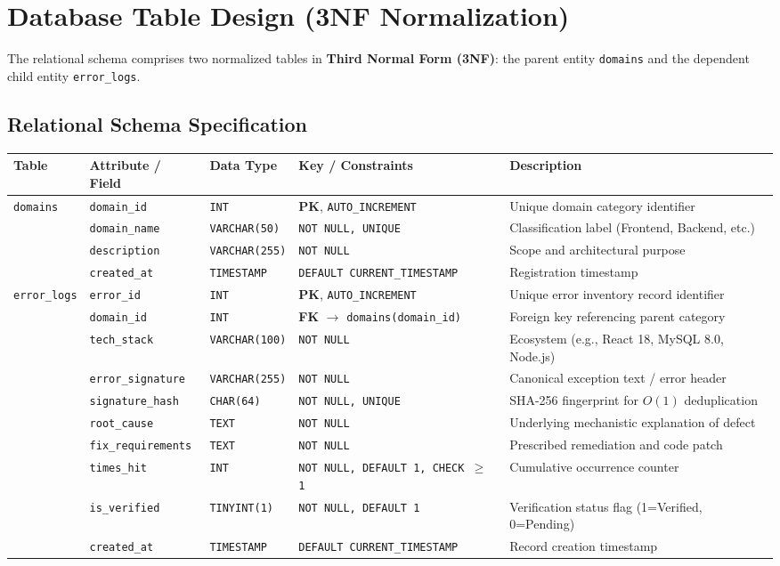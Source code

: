 \documentclass[10pt,a4paper]{article}
\begin{document}
\section{Database Table Design (3NF Normalization)}
The relational schema comprises two normalized tables in \textbf{Third Normal Form (3NF)}: the parent entity \texttt{domains} and the dependent child entity \texttt{error\_logs}.

\subsection{Relational Schema Specification}
\begin{center}
\scriptsize
\begin{tabular}{lllll}
\toprule
\textbf{Table} & \textbf{Attribute / Field} & \textbf{Data Type} & \textbf{Key / Constraints} & \textbf{Description} \\
\midrule
\texttt{domains} & \texttt{domain\_id} & \texttt{INT} & \textbf{PK}, \texttt{AUTO\_INCREMENT} & Unique domain category identifier \\
 & \texttt{domain\_name} & \texttt{VARCHAR(50)} & \texttt{NOT NULL, UNIQUE} & Classification label (Frontend, Backend, etc.) \\
 & \texttt{description} & \texttt{VARCHAR(255)} & \texttt{NOT NULL} & Scope and architectural purpose \\
 & \texttt{created\_at} & \texttt{TIMESTAMP} & \texttt{DEFAULT CURRENT\_TIMESTAMP} & Registration timestamp \\
\midrule
\texttt{error\_logs} & \texttt{error\_id} & \texttt{INT} & \textbf{PK}, \texttt{AUTO\_INCREMENT} & Unique error inventory record identifier \\
 & \texttt{domain\_id} & \texttt{INT} & \textbf{FK} $\to$ \texttt{domains(domain\_id)} & Foreign key referencing parent category \\
 & \texttt{tech\_stack} & \texttt{VARCHAR(100)} & \texttt{NOT NULL} & Ecosystem (e.g., React 18, MySQL 8.0, Node.js) \\
 & \texttt{error\_signature} & \texttt{VARCHAR(255)} & \texttt{NOT NULL} & Canonical exception text / error header \\
 & \texttt{signature\_hash} & \texttt{CHAR(64)} & \texttt{NOT NULL, UNIQUE} & SHA-256 fingerprint for $O(1)$ deduplication \\
 & \texttt{root\_cause} & \texttt{TEXT} & \texttt{NOT NULL} & Underlying mechanistic explanation of defect \\
 & \texttt{fix\_requirements} & \texttt{TEXT} & \texttt{NOT NULL} & Prescribed remediation and code patch \\
 & \texttt{times\_hit} & \texttt{INT} & \texttt{NOT NULL, DEFAULT 1, CHECK $\ge$ 1} & Cumulative occurrence counter \\
 & \texttt{is\_verified} & \texttt{TINYINT(1)} & \texttt{NOT NULL, DEFAULT 1} & Verification status flag (1=Verified, 0=Pending) \\
 & \texttt{created\_at} & \texttt{TIMESTAMP} & \texttt{DEFAULT CURRENT\_TIMESTAMP} & Record creation timestamp \\
\bottomrule
\end{tabular}
\end{center}
\end{document}
